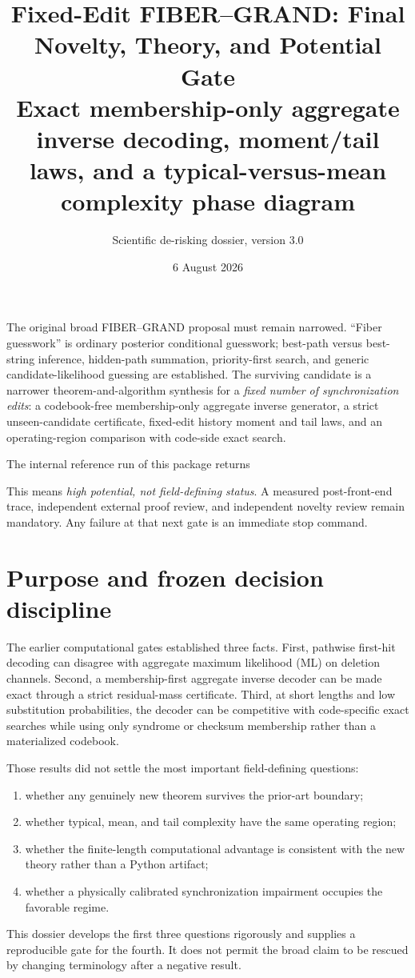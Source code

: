 \documentclass[11pt]{article}
\title{\textbf{Fixed-Edit FIBER--GRAND: Final Novelty, Theory, and Potential Gate}\\[1.5mm]
\large Exact membership-only aggregate inverse decoding, moment/tail laws, and a typical-versus-mean complexity phase diagram}
\author{Scientific de-risking dossier, version 3.0}
\date{6 August 2026}
\theoremstyle{definition}
\theoremstyle{remark}
\begin{document}
\maketitle

\begin{tcolorbox}[colback=blue!4,colframe=blue!55!black,title=Authoritative scientific status]
The original broad FIBER--GRAND proposal must remain narrowed.  ``Fiber guesswork'' is ordinary posterior conditional guesswork; best-path versus best-string inference, hidden-path summation, priority-first search, and generic candidate-likelihood guessing are established.  The surviving candidate is a narrower theorem-and-algorithm synthesis for a \emph{fixed number of synchronization edits}: a codebook-free membership-only aggregate inverse generator, a strict unseen-candidate certificate, fixed-edit history moment and tail laws, and an operating-region comparison with code-side exact search.

The internal reference run of this package returns
\begin{center}
\small{}
\end{center}
This means \emph{high potential, not field-defining status}.  A measured post-front-end trace, independent external proof review, and independent novelty review remain mandatory.  Any failure at that next gate is an immediate stop command.
\end{tcolorbox}

\tableofcontents
\newpage

\section{Purpose and frozen decision discipline}
The earlier computational gates established three facts.  First, pathwise first-hit decoding can disagree with aggregate maximum likelihood (ML) on deletion channels.  Second, a membership-first aggregate inverse decoder can be made exact through a strict residual-mass certificate.  Third, at short lengths and low substitution probabilities, the decoder can be competitive with code-specific exact searches while using only syndrome or checksum membership rather than a materialized codebook.

Those results did not settle the most important field-defining questions:
\begin{enumerate}[label=(\roman*),leftmargin=2em]
\item whether any genuinely new theorem survives the prior-art boundary;
\item whether typical, mean, and tail complexity have the same operating region;
\item whether the finite-length computational advantage is consistent with the new theory rather than a Python artifact;
\item whether a physically calibrated synchronization impairment occupies the favorable regime.
\end{enumerate}
This dossier develops the first three questions rigorously and supplies a reproducible gate for the fourth.  It does not permit the broad claim to be rescued by changing terminology after a negative result.
\end{document}
